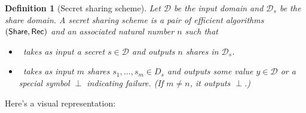 \documentclass[12 pt]{article}
\newtheorem{definition}{Definition}
\def\D{\ensuremath{\mathcal{D}}}
\def\bin{\ensuremath{\{0, 1\}}}
\begin{document}
\begin{definition}[Secret sharing scheme]\label{def:ss}
    Let $\D$ be the input domain and $\D_s$ be the share domain.
    A secret sharing scheme is a pair of efficient algorithms $(\mathsf{Share}, \mathsf{Rec})$
    and an associated natural number $n$ such that

    \begin{itemize}
        \item \share~takes as input a secret $s \in \D$ and outputs $n$ 
        shares in $\D_s$.
        \item \rec~takes as input $m$ shares $s_1, \ldots, s_m \in D_s$ 
        and outputs some value $y \in \D$ or a special symbol $\perp$ 
        indicating failure. (If $m \neq n$, it outputs $\perp$.)
    \end{itemize}
\end{definition}


Here's a visual representation: 
\end{document}
